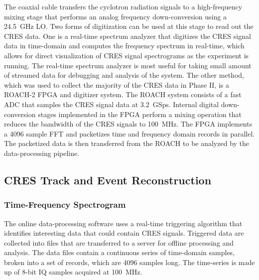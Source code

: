 The coaxial cable transfers the cyclotron radiation signals to a high-frequency mixing stage that performs an analog frequency down-conversion using a 24.5~GHz LO. Two forms of digitization can be used at this stage to read out the CRES data. One is a real-time spectrum analyzer that digitizes the CRES signal data in time-domain and computes the frequency spectrum in real-time, which allows for direct visualization of CRES signal spectrograms as the experiment is running. The real-time spectrum analyzer is most useful for taking small amount of streamed data for debugging and analysis of the system. The other method, which was used to collect the majority of the CRES data in Phase II, is a ROACH-2 FPGA and digitizer system. The ROACH system consists of a fast ADC that samples the CRES signal data at 3.2~GSps. Internal digital down-conversion stages implemented in the FPGA perform a mixing operation that reduces the bandwidth of the CRES signals to 100~MHz. The FPGA implements a 4096 sample FFT and packetizes time and frequency domain records in parallel. The packetized data is then transferred from the ROACH to be analyzed by the data-processing pipeline.

\subsection{CRES Track and Event Reconstruction}

\subsubsection*{Time-Frequency Spectrogram}

The online data-processing software uses a real-time triggering algorithm that identifies interesting data that could contain CRES signals. Triggered data are collected into files that are transferred to a server for offline processing and analysis. The data files contain a continuous series of time-domain samples, broken into a set of records, which are 4096 samples long. The time-series is made up of 8-bit IQ samples acquired at 100~MHz. 

